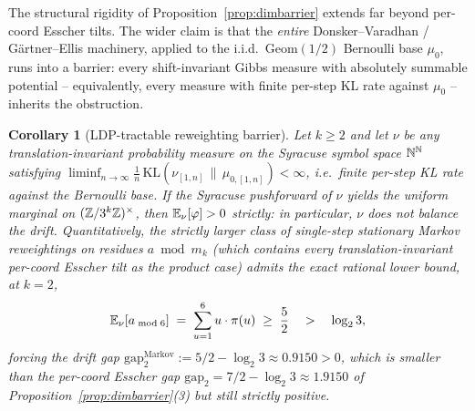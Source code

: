 \documentclass[11pt]{amsart}
\newtheorem{corollary}[theorem]{Corollary}
\theoremstyle{definition}
\theoremstyle{remark}
\begin{document}
The structural rigidity of Proposition~\ref{prop:dimbarrier} extends far beyond per-coord Esscher
tilts. The wider claim is that the \emph{entire} Donsker--Varadhan / G\"artner--Ellis machinery,
applied to the i.i.d.\ Geom$(1/2)$ Bernoulli base $\mu_0$, runs into a barrier: every
shift-invariant Gibbs measure with absolutely summable potential -- equivalently, every measure
with finite per-step KL rate against $\mu_0$ -- inherits the obstruction.

\begin{corollary}[LDP-tractable reweighting barrier]\label{cor:ldp-barrier}
Let $k\ge2$ and let $\nu$ be any translation-invariant probability measure on the Syracuse symbol
space $\mathbb{N}^{\mathbb{N}}$ satisfying $\liminf_{n\to\infty}\frac1n\,\mathrm{KL}(\nu_{[1,n]}\,\|\,\mu_{0,[1,n]})<\infty$,
i.e.\ finite per-step KL rate against the Bernoulli base. If the Syracuse pushforward of $\nu$
yields the uniform marginal on $(\mathbb{Z}/3^{k}\mathbb{Z})^{\times}$, then $\mathbb{E}_\nu[\varphi]>0$ \emph{strictly}: in particular,
$\nu$ does not balance the drift. Quantitatively, the strictly larger class of single-step stationary
Markov reweightings on residues $a\bmod m_k$ (which contains every translation-invariant per-coord
Esscher tilt as the product case) admits the exact rational lower bound, at $k=2$,
\begin{equation}
   \mathbb{E}_\nu[a_{\bmod 6}]\;=\;\sum_{u=1}^{6} u\cdot \pi(u)\;\ge\;\frac{5}{2}\quad >\quad \log_2 3,
   \label{eq:markov-lp-bound}
\end{equation}
forcing the drift gap
$\mathrm{gap}^{\mathrm{Markov}}_2 := 5/2-\log_2 3\approx 0.9150>0$,
which is smaller than the per-coord Esscher gap $\mathrm{gap}_2=7/2-\log_2 3\approx 1.9150$
of Proposition~\textup{\ref{prop:dimbarrier}}(3) but still strictly positive.
\end{corollary}
\end{document}
